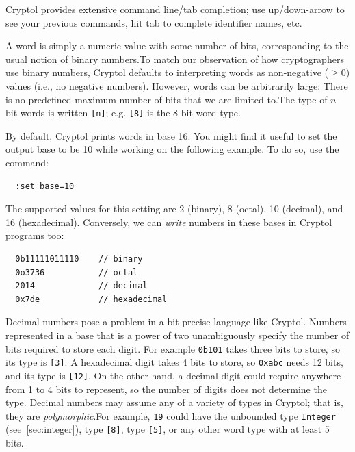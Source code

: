 \begin{tip}
  Cryptol provides extensive command line/tab completion; use
  up/down-arrow to see your previous commands, hit tab to complete
  identifier names, etc.
\end{tip}


A word is simply a numeric value with some number of bits,
corresponding to the usual notion of binary numbers.\indTheWordType To
match our observation of how cryptographers use binary numbers,
Cryptol defaults to interpreting words as non-negative ($\geq 0$)
values (i.e., no negative numbers). However, words
can be arbitrarily large: There is no predefined maximum number of
bits that we are limited to.\indArbitraryPrecision The type of $n$-bit
words is written \texttt{[n]}; e.g. \texttt{[8]} is the 8-bit word type.

By default, Cryptol prints words in base 16. You might find it useful
to set the output base to be 10 while working on the following
example. To do so, use the command:\indSettingBase
\begin{Verbatim}
  :set base=10
\end{Verbatim}
The supported values for this setting are 2 (binary), 8 (octal), 10
(decimal), and 16 (hexadecimal).  Conversely, we can \emph{write}
numbers in these bases in Cryptol programs too:
\begin{Verbatim}
  0b11111011110    // binary
  0o3736           // octal
  2014             // decimal
  0x7de            // hexadecimal
\end{Verbatim}

Decimal numbers pose a problem in a bit-precise language like Cryptol.
Numbers represented in a base that is a power of two unambiguously
specify the number of bits required to store each digit. For example
\texttt{0b101} takes three bits to store, so its type is \texttt{[3]}.
A hexadecimal digit takes 4 bits to store, so \texttt{0xabc} needs 12
bits, and its type is \texttt{[12]}. On the other hand, a decimal
digit could require anywhere from 1 to 4 bits to represent, so the
number of digits does not determine the type. Decimal numbers may
assume any of a variety of types in Cryptol; that is, they are
\emph{polymorphic}.\indPolymorphism For example, \texttt{19} could
have the unbounded type \texttt{Integer} (see~\autoref{sec:integer}),
type \texttt{[8]}, type \texttt{[5]}, or any other word type with at
least 5 bits.

